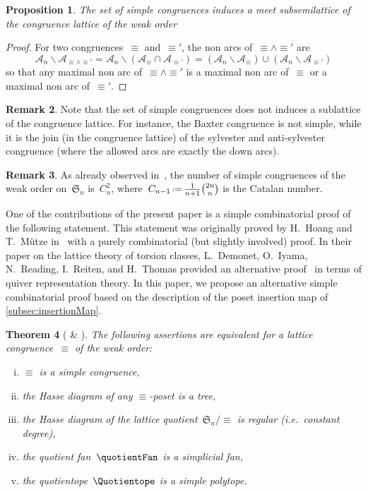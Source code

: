 \documentclass{amsart}
\newtheorem{theorem}{Theorem}[section]
\newtheorem{proposition}[theorem]{Proposition}
\theoremstyle{definition}
\newtheorem{remark}[theorem]{Remark}
\newcommand{\f}[1]{{\mathfrak{#1}}} %
\newcommand{\ssm}{\smallsetminus} %
\newcommand{\eqdef}{\mbox{\,\raisebox{0.2ex}{\scriptsize\ensuremath{\mathrm:}}\ensuremath{=}\,}} %
\newcommand{\ie}{\textit{i.e.}~} %
\newcommand{\arcs}{{\mathcal{A}}} %
\newcommand{\meet}{\wedge} %
\begin{document}
\begin{proposition}
\label{prop:simpleCongruenceMeetSemilattice}
The set of simple congruences induces a meet subsemilattice of the congruence lattice of the weak order
\end{proposition}

\begin{proof}
For two congruences~$\equiv$ and~$\equiv'$, the non arcs of~${\equiv} \meet {\equiv'}$ are
\[
\arcs_n \ssm \arcs_{{\equiv} \meet {\equiv'}} = \arcs_n \ssm (\arcs_{\equiv} \cap \arcs_{\equiv'}) = (\arcs_n \ssm \arcs_{\equiv}) \cup (\arcs_n \ssm \arcs_{\equiv'})
\]
so that any maximal non arc of~${\equiv} \meet {\equiv'}$ is a maximal non arc of~${\equiv}$ or a maximal non arc of~${\equiv'}$.
\end{proof}

\begin{remark}
Note that the set of simple congruences does not induces a sublattice of the congruence lattice.
For instance, the Baxter congruence is not simple, while it is the join (in the congruence lattice) of the sylvester and anti-sylvester congruence (where the allowed arcs are exactly the down arcs).
\end{remark}

\begin{remark}
As already observed in~\cite[Sect.~4.4]{HoangMutze}, the number of simple congruences of the weak order on~$\f{S}_n$ is~$C_n^2$, where~$C_{n-1} \eqdef \frac{1}{n+1} \binom{2n}{n}$ is the Catalan number.
\end{remark}

One of the contributions of the present paper is a simple combinatorial proof of the following statement.
This statement was originally proved by H.~Hoang and T.~Mütze in~\cite[Sect.~4.4]{HoangMutze} with a purely combinatorial (but slightly involved) proof.
In their paper on the lattice theory of torsion classes, L.~Demonet, O.~Iyama, N.~Reading, I.~Reiten, and H.~Thomas provided an alternative proof~\cite[Sect.~6.3]{DemonetIyamaReadingReitenThomas} in terms of quiver representation theory.
In this paper, we propose an alternative simple combinatorial proof based on the description of the poset insertion map of \cref{subsec:insertionMap}.

\begin{theorem}[{\cite[Sect.~4.4]{HoangMutze} \& \cite[Sect.~6.3]{DemonetIyamaReadingReitenThomas}}]
\label{thm:simpleCongruences}
The following assertions are equivalent for a lattice congruence~$\equiv$ of the weak order:
\begin{enumerate}[(i)]
\item $\equiv$ is a simple congruence,
\item the Hasse diagram of any $\equiv$-poset is a tree,
\item the Hasse diagram of the lattice quotient~$\f{S}_n/{\equiv}$ is regular (\ie constant degree),
\item the quotient fan~$\quotientFan$ is a simplicial fan,
\item the quotientope~$\Quotientope$ is a simple polytope.
\end{enumerate}
\end{theorem}
\end{document}
